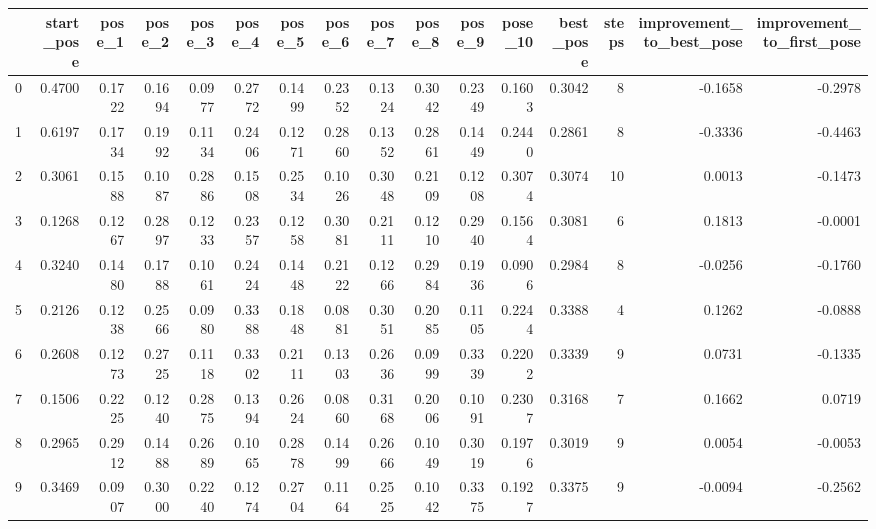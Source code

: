 \begin{tabular}{lrrrrrrrrrrrrrrr}
\toprule
{} &  start\_pose &  pose\_1 &  pose\_2 &  pose\_3 &  pose\_4 &  pose\_5 &  pose\_6 &  pose\_7 &  pose\_8 &  pose\_9 &  pose\_10 &  best\_pose &  steps &  improvement\_to\_best\_pose &  improvement\_to\_first\_pose \\
\midrule
0   &      0.4700 &  0.1722 &  0.1694 &  0.0977 &  0.2772 &  0.1499 &  0.2352 &  0.1324 &  0.3042 &  0.2349 &   0.1603 &     0.3042 &      8 &                   -0.1658 &                    -0.2978 \\
1   &      0.6197 &  0.1734 &  0.1992 &  0.1134 &  0.2406 &  0.1271 &  0.2860 &  0.1352 &  0.2861 &  0.1449 &   0.2440 &     0.2861 &      8 &                   -0.3336 &                    -0.4463 \\
2   &      0.3061 &  0.1588 &  0.1087 &  0.2886 &  0.1508 &  0.2534 &  0.1026 &  0.3048 &  0.2109 &  0.1208 &   0.3074 &     0.3074 &     10 &                    0.0013 &                    -0.1473 \\
3   &      0.1268 &  0.1267 &  0.2897 &  0.1233 &  0.2357 &  0.1258 &  0.3081 &  0.2111 &  0.1210 &  0.2940 &   0.1564 &     0.3081 &      6 &                    0.1813 &                    -0.0001 \\
4   &      0.3240 &  0.1480 &  0.1788 &  0.1061 &  0.2424 &  0.1448 &  0.2122 &  0.1266 &  0.2984 &  0.1936 &   0.0906 &     0.2984 &      8 &                   -0.0256 &                    -0.1760 \\
5   &      0.2126 &  0.1238 &  0.2566 &  0.0980 &  0.3388 &  0.1848 &  0.0881 &  0.3051 &  0.2085 &  0.1105 &   0.2244 &     0.3388 &      4 &                    0.1262 &                    -0.0888 \\
6   &      0.2608 &  0.1273 &  0.2725 &  0.1118 &  0.3302 &  0.2111 &  0.1303 &  0.2636 &  0.0999 &  0.3339 &   0.2202 &     0.3339 &      9 &                    0.0731 &                    -0.1335 \\
7   &      0.1506 &  0.2225 &  0.1240 &  0.2875 &  0.1394 &  0.2624 &  0.0860 &  0.3168 &  0.2006 &  0.1091 &   0.2307 &     0.3168 &      7 &                    0.1662 &                     0.0719 \\
8   &      0.2965 &  0.2912 &  0.1488 &  0.2689 &  0.1065 &  0.2878 &  0.1499 &  0.2666 &  0.1049 &  0.3019 &   0.1976 &     0.3019 &      9 &                    0.0054 &                    -0.0053 \\
9   &      0.3469 &  0.0907 &  0.3000 &  0.2240 &  0.1274 &  0.2704 &  0.1164 &  0.2525 &  0.1042 &  0.3375 &   0.1927 &     0.3375 &      9 &                   -0.0094 &                    -0.2562 \\

\end{tabular}

